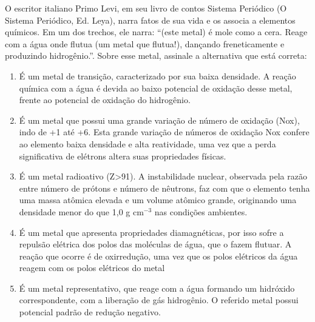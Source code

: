 O escritor italiano Primo Levi, em seu livro de contos Sistema Periódico (O Sistema Periódico, Ed. Leya), narra fatos de sua vida e os associa a elementos químicos.
Em um dos trechos, ele narra: ``(este metal) é mole como a cera. Reage com a água onde flutua (um metal que flutua!), dançando freneticamente e produzindo hidrogênio.''. Sobre esse metal, assinale a alternativa que está correta:

\begin{enumerate}[label = (\alph*)]
	\item É um metal de transição, caracterizado por sua baixa densidade. A reação química com a água é devida ao baixo potencial de oxidação desse metal, frente ao potencial de oxidação do hidrogênio.
	\item É um metal que possui uma grande variação de número de oxidação (Nox), indo de +1 até +6. Esta grande variação de números de oxidação Nox confere ao elemento baixa densidade e alta reatividade, uma vez que a perda significativa de elétrons altera suas propriedades físicas. 
	\item É um metal radioativo (Z>91). A instabilidade nuclear, observada pela razão entre número de prótons e número de nêutrons, faz com que o elemento tenha uma massa atômica elevada e um volume atômico grande, originando uma densidade menor do que 1,0 g cm$^{-3}$ nas condições ambientes.
	\item É um metal que apresenta propriedades diamagnéticas, por isso sofre a repulsão elétrica dos polos das moléculas de água, que o fazem flutuar. A reação que ocorre é de oxirredução, uma vez que os polos elétricos da água reagem com os polos elétricos do metal
	\item É um metal representativo, que reage com a água formando um hidróxido correspondente, com a liberação de gás hidrogênio. O referido metal possui potencial padrão de redução negativo.
\end{enumerate}
